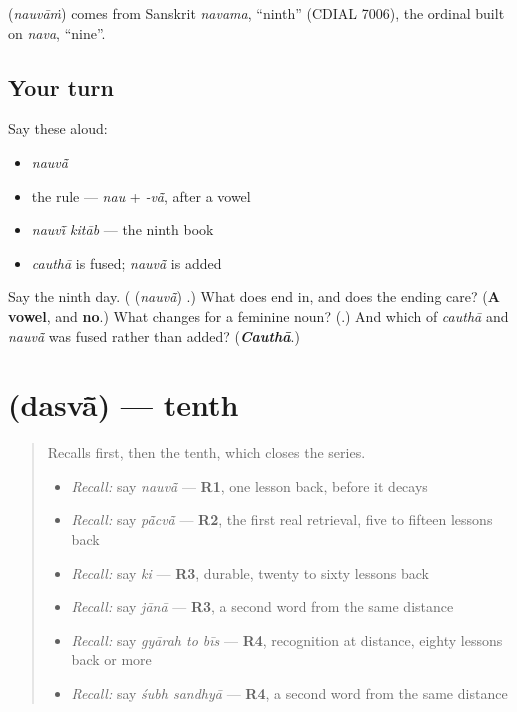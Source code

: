 \begin{cousinweb}
\textbf{} (\emph{nauvāṁ}) comes from Sanskrit \emph{navama}, \textquotedblleft{}ninth\textquotedblright{} (CDIAL 7006), the ordinal built on \emph{nava}, \textquotedblleft{}nine\textquotedblright{}.
\end{cousinweb}

\subsection*{Your turn}
Say these aloud:

\begin{itemize}
\raggedright
  \item \emph{nauvā̃}
  \item the rule — \emph{nau} + \emph{-vā̃}, after a vowel
  \item \emph{nauvī̃ kitāb} — the ninth book
  \item \emph{cauthā} is fused; \emph{nauvā̃} is added
\end{itemize}

\begin{tcolorbox}[breakable,colback=teal!4,colframe=teal!35!black,title={Before you move on}]
Say the ninth day. (\textbf{} (\emph{nauvā̃}) \textbf{}.) What does \emph{} end in, and does the ending care? (\textbf{A vowel}, and \textbf{no}.) What changes for a feminine noun? (\textbf{}.) And which of \emph{cauthā} and \emph{nauvā̃} was fused rather than added? (\emph{\textbf{Cauthā}}.)
\end{tcolorbox}
\section[\texorpdfstring{\hi{दसवाँ} / \hi{दसवीं} (dasvā̃ / dasvī̃)}{दसवाँ / दसवीं (dasvā̃ / dasvī̃)}]{ (dasvā̃) — tenth}

\label{lesson:HI-C76-tenth}



\begin{quote}
Recalls first, then the tenth, which closes the series.

\begin{itemize}
\raggedright
  \item \emph{Recall:} say \emph{nauvā̃} — \textbf{R1}, one lesson back, before it decays
  \item \emph{Recall:} say \emph{pā̃cvā̃} — \textbf{R2}, the first real retrieval, five to fifteen lessons back
  \item \emph{Recall:} say \emph{ki} — \textbf{R3}, durable, twenty to sixty lessons back
  \item \emph{Recall:} say \emph{jānā} — \textbf{R3}, a second word from the same distance
  \item \emph{Recall:} say \emph{gyārah to bīs} — \textbf{R4}, recognition at distance, eighty lessons back or more
  \item \emph{Recall:} say \emph{śubh sandhyā} — \textbf{R4}, a second word from the same distance
\end{itemize}
\end{quote}

